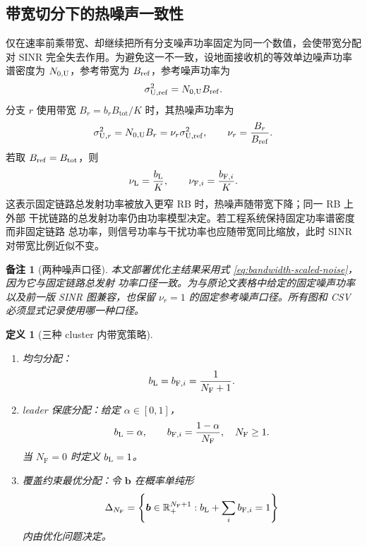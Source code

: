 \documentclass[UTF8,a4paper,11pt]{ctexart}
\newtheorem{definition}{定义}[section]
\newtheorem{remark}{备注}[section]
\newcommand{\NF}{N_{\mathrm F}}
\newcommand{\Btot}{B_{\mathrm{tot}}}
\newcommand{\bvec}{\bm b}
\newcommand{\Simplex}{\Delta}
\begin{document}
\subsection{带宽切分下的热噪声一致性}

仅在速率前乘带宽、却继续把所有分支噪声功率固定为同一个数值，会使带宽分配对
SINR 完全失去作用。为避免这一不一致，设地面接收机的等效单边噪声功率谱密度为
$N_{0,\rm U}$，参考带宽为 $B_{\rm ref}$，参考噪声功率为
\begin{equation}
 \sigma_{\rm U,ref}^2=N_{0,\rm U}B_{\rm ref}.
 \label{eq:reference-noise}
\end{equation}
分支 $r$ 使用带宽 $B_r=b_r\Btot/K$ 时，其热噪声功率为
\begin{equation}
 \sigma_{{\rm U},r}^2
 =N_{0,\rm U}B_r
 =\nu_r\sigma_{\rm U,ref}^2,
 \qquad
 \nu_r=\frac{B_r}{B_{\rm ref}}.
 \label{eq:bandwidth-scaled-noise}
\end{equation}
若取 $B_{\rm ref}=\Btot$，则
\begin{equation}
 \nu_{\rm L}=\frac{b_{\rm L}}{K},
 \qquad
 \nu_{{\rm F},i}=\frac{b_{{\rm F},i}}{K}.
 \label{eq:branch-noise-factor}
\end{equation}
这表示固定链路总发射功率被放入更窄 RB 时，热噪声随带宽下降；同一 RB 上外部
干扰链路的总发射功率仍由功率模型决定。若工程系统保持固定功率谱密度而非固定链路
总功率，则信号功率与干扰功率也应随带宽同比缩放，此时 SINR 对带宽比例近似不变。

\begin{remark}[两种噪声口径]
本文部署优化主结果采用式 \eqref{eq:bandwidth-scaled-noise}，因为它与固定链路总发射
功率口径一致。为与原论文表格中给定的固定噪声功率以及前一版 SINR 图兼容，也保留
$\nu_r=1$ 的固定参考噪声口径。所有图和 CSV 必须显式记录使用哪一种口径。
\end{remark}

\begin{definition}[三种 cluster 内带宽策略]
\begin{enumerate}[leftmargin=2em]
  \item 均匀分配：
  \begin{equation}
   b_{\rm L}=b_{{\rm F},i}=\frac{1}{\NF+1}.
   \label{eq:equal-bandwidth}
  \end{equation}
  \item leader 保底分配：给定 $\alpha\in[0,1]$，
  \begin{equation}
   b_{\rm L}=\alpha,\qquad
   b_{{\rm F},i}=\frac{1-\alpha}{\NF},\quad \NF\geq1.
   \label{eq:alpha-bandwidth}
  \end{equation}
  当 $\NF=0$ 时定义 $b_{\rm L}=1$。
  \item 覆盖约束最优分配：令 $\bvec$ 在概率单纯形
  \begin{equation}
   \Simplex_{\NF}
   =\left\{\bvec\in\mathbb R_+^{\NF+1}:
   b_{\rm L}+\sum_i b_{{\rm F},i}=1\right\}
   \label{eq:bandwidth-domain}
  \end{equation}
  内由优化问题决定。
\end{enumerate}
\end{definition}
\end{document}
